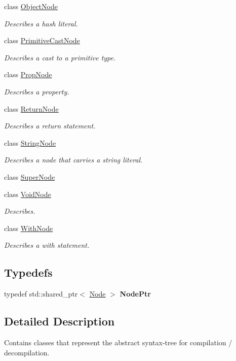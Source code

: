 \begin{DoxyCompactItemize}
class \hyperlink{classjswf_1_1avm2_1_1ast_1_1_object_node}{Object\+Node}
\begin{DoxyCompactList}\small\item\em Describes a hash literal. \end{DoxyCompactList}\item 
class \hyperlink{classjswf_1_1avm2_1_1ast_1_1_primitive_cast_node}{Primitive\+Cast\+Node}
\begin{DoxyCompactList}\small\item\em Describes a cast to a primitive type. \end{DoxyCompactList}\item 
class \hyperlink{classjswf_1_1avm2_1_1ast_1_1_prop_node}{Prop\+Node}
\begin{DoxyCompactList}\small\item\em Describes a property. \end{DoxyCompactList}\item 
class \hyperlink{classjswf_1_1avm2_1_1ast_1_1_return_node}{Return\+Node}
\begin{DoxyCompactList}\small\item\em Describes a return statement. \end{DoxyCompactList}\item 
class \hyperlink{classjswf_1_1avm2_1_1ast_1_1_string_node}{String\+Node}
\begin{DoxyCompactList}\small\item\em Describes a node that carries a string literal. \end{DoxyCompactList}\item 
class \hyperlink{classjswf_1_1avm2_1_1ast_1_1_super_node}{Super\+Node}
\item 
class \hyperlink{classjswf_1_1avm2_1_1ast_1_1_void_node}{Void\+Node}
\begin{DoxyCompactList}\small\item\em Describes. \end{DoxyCompactList}\item 
class \hyperlink{classjswf_1_1avm2_1_1ast_1_1_with_node}{With\+Node}
\begin{DoxyCompactList}\small\item\em Describes a {\ttfamily with} statement. \end{DoxyCompactList}\end{DoxyCompactItemize}
\subsection*{Typedefs}
\begin{DoxyCompactItemize}
\item 
\hypertarget{namespacejswf_1_1avm2_1_1ast_afcc18805ba147fedfb07fcdcfbc104ca}{typedef std\+::shared\+\_\+ptr$<$ \hyperlink{classjswf_1_1avm2_1_1ast_1_1_node}{Node} $>$ {\bfseries Node\+Ptr}}\label{namespacejswf_1_1avm2_1_1ast_afcc18805ba147fedfb07fcdcfbc104ca}

\end{DoxyCompactItemize}


\subsection{Detailed Description}
Contains classes that represent the abstract syntax-\/tree for compilation / decompilation. 